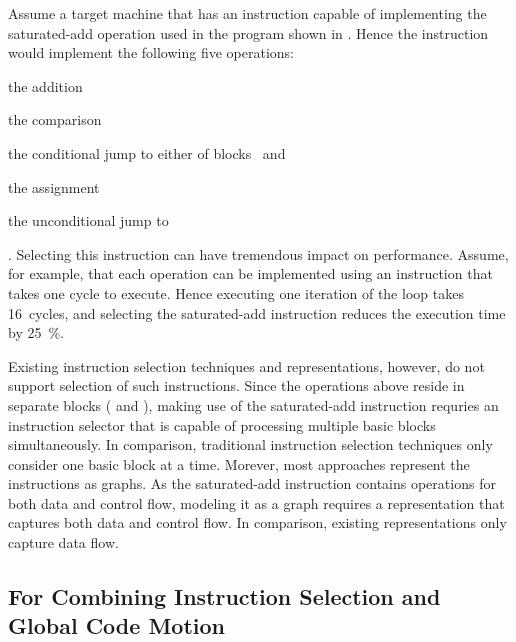 Assume a \gls{target machine} that has an instruction capable of implementing
the saturated-add \gls{operation} used in the \gls{program} shown in
.
%
Hence the \gls{instruction} would implement the following five
\glspl{operation}:%
%
\begin{inlinelist}[itemjoin={, }, itemjoin*={, and}]
  \item the  addition
  \item the  comparison
  \item the conditional jump to either of blocks~ and~
  \item the  assignment
  \item the unconditional jump to~
\end{inlinelist}.
%
Selecting this \gls{instruction} can have tremendous impact on performance.
%
Assume, for example, that each \gls{operation} can be implemented using an
\gls{instruction} that takes one cycle to execute.
%
Hence executing one iteration of the loop takes \num{16}~cycles, and selecting
the saturated-add \gls{instruction} reduces the execution time by
\SI{25}{\percent}.

Existing \gls{instruction selection} techniques and representations, however, do
not support selection of such \glspl{instruction}.
%
Since the \glspl{operation} above reside in separate \glspl{block}
( and ), making use of the saturated-add
\gls{instruction} requries an \gls{instruction selector} that is capable of
processing multiple \glspl{basic block} simultaneously.
%
In comparison, traditional \gls{instruction selection} techniques only consider
one \gls{basic block} at a time.
%
Morever, most approaches represent the \glspl{instruction} as \glspl{graph}.
%
As the saturated-add \gls{instruction} contains \glspl{operation} for both data
and control flow, modeling it as a \gls{graph} requires a representation that
captures both data and control flow.
%
In comparison, existing representations only capture data flow.


\subsection{For Combining Instruction Selection and Global Code Motion}

